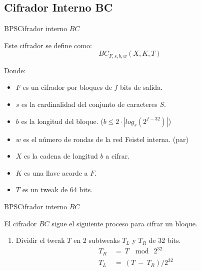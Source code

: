 %
%

\subsection{Cifrador Interno BC}

\begin{frame}{BPS}{Cifrador interno $BC$}

  Este cifrador se define como:
    \begin{equation}
      BC_{F,s,b,w}(X,K,T)
    \end{equation}
    
  Donde:
  \begin{itemize}
    \item $F$ es un cifrador por bloques de $f$ bits de salida.
    \item $s$ es la cardinalidad del conjunto de caracteres $S$.
    \item $b$ es la longitud del bloque. ($b \leq 2 \cdot |log_s(2^{f-32})|$)
    \item $w$ es el número de rondas de la red Feistel interna. (par)
    \item $X$ es la cadena de longitud $b$ a cifrar.
    \item $K$ es una llave acorde a $F$.
    \item $T$ es un tweak de 64 bits.
  \end{itemize}
  
\end{frame}

\begin{frame}{BPS}{Cifrador interno $BC$}

  El cifrador $BC$ sigue el siguiente proceso para cifrar un bloque.
  
  \begin{enumerate}  
    \item Dividir el tweak $T$ en 2 subtweaks $T_L$ y $T_R$ de 32 bits.
      \begin{align}
        T_R\: &=\: T\: \mod\: 2^{32}  \\
        T_L\: &=\: (T\: -\: T_R) / 2^{32}
      \end{align}
  \end{enumerate}
  
\end{frame}

